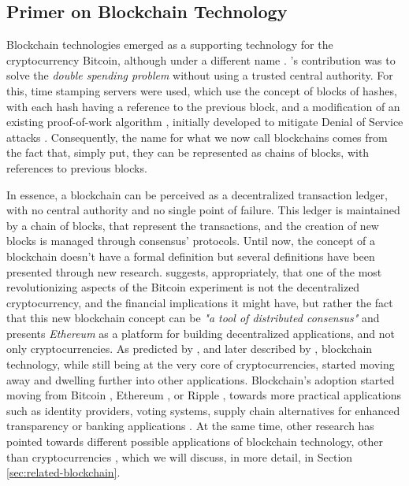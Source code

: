 \subsection{Primer on Blockchain Technology}

Blockchain technologies emerged as a supporting technology for the cryptocurrency Bitcoin, although under a different name \cite{nakamoto_bitcoin:_2008}. \citeauthor{nakamoto_bitcoin:_2008}'s contribution was to solve the \textit{double spending problem} without using a trusted central authority. For this, time stamping servers were used, which use the concept of blocks of hashes, with each hash having a reference to the previous block, and a modification of an existing proof-of-work algorithm \cite{back_hashcash_2002}, initially developed to mitigate Denial of Service attacks \cite[1]{back_hashcash_2002}. Consequently, the name for what we now call blockchains comes from the fact that, simply put, they can be represented as chains of blocks, with references to previous blocks.

In essence, a blockchain can be perceived as a decentralized transaction ledger, with no central authority and no single point of failure. This ledger is maintained by a chain of blocks, that represent the transactions, and the creation of new blocks is managed through consensus' protocols. Until now, the concept of a blockchain doesn't have a formal definition but several definitions have been presented through new research. \citeauthor{buterin_next-generation_2013} \cite{buterin_next-generation_2013} suggests, appropriately, that one of the most revolutionizing aspects of the Bitcoin experiment is not the decentralized cryptocurrency, and the financial implications it might have, but rather the fact that this new blockchain concept can be \textit{"a tool of distributed consensus"} \cite{buterin_next-generation_2013} and presents \textit{Ethereum} as a platform for building decentralized applications, and not only cryptocurrencies. As predicted by \citeauthor{buterin_next-generation_2013} \cite{buterin_next-generation_2013}, and later described by \citeauthor{pilkington_blockchain_2016} \cite{pilkington_blockchain_2016}, blockchain technology, while still being at the very core of cryptocurrencies, started moving away and dwelling further into other applications. Blockchain's adoption started moving from Bitcoin \cite{nakamoto_bitcoin:_2008}, Ethereum \cite{buterin_next-generation_2013}, or Ripple \cite{schwartz_ripple_2014}, towards more practical applications such as identity providers, voting systems, supply chain alternatives for enhanced transparency or banking applications \cite{pilkington_blockchain_2016}. At the same time, other research has pointed towards different possible applications of blockchain technology, other than cryptocurrencies \cite{crosby_blockchain_2016, underwood_blockchain_2016, yermack_corporate_2017, xu_blockchain_2016}, which we will discuss, in more detail, in Section \ref{sec:related-blockchain}.

